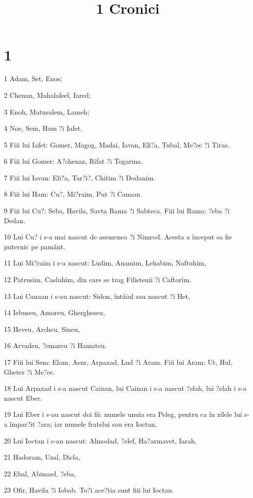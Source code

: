 

\title{1 Cronici}


\chapter{1}

\par 1 Adam, Set, Enos;
\par 2 Chenan, Mahalaleel, Iared;
\par 3 Enoh, Matusalem, Lameh;
\par 4 Noe, Sem, Ham ?i Iafet.
\par 5 Fiii lui Iafet: Gomer, Magog, Madai, Iavan, Eli?a, Tubal, Me?ec ?i Tiras.
\par 6 Fiii lui Gomer: A?chenaz, Rifat ?i Togarma.
\par 7 Fiii lui Iavan: Eli?a, Tar?i?, Chitim ?i Dodanim.
\par 8 Fiii lui Ham: Cu?, Mi?raim, Put ?i Canaan.
\par 9 Fiii lui Cu?: Seba, Havila, Savta Rama ?i Sabteca. Fiii lui Rama: ?eba ?i Dedan.
\par 10 Lui Cu? i s-a mai nascut de asemenea ?i Nimrod. Acesta a început sa fie puternic pe pamânt.
\par 11 Lui Mi?raim i s-a nascut: Ludim, Anamim, Lehabim, Naftuhim,
\par 12 Patrusim, Casluhim, din care se trag Filistenii ?i Caftorim.
\par 13 Lui Canaan i s-au nascut: Sidon, întâiul sau nascut ?i Het,
\par 14 Iebuseu, Amoreu, Ghergheseu,
\par 15 Heveu, Archeu, Sineu,
\par 16 Arvadeu, ?emareu ?i Hamateu.
\par 17 Fiii lui Sem: Elam, Asur, Arpaxad, Lud ?i Aram. Fiii lui Aram: Ut, Hul, Gheter ?i Me?ec.
\par 18 Lui Arpaxad i s-a nascut Cainan, lui Cainan i s-a nascut ?elah, lui ?elah i s-a nascut Eber.
\par 19 Lui Eber i s-au nascut doi fii: numele unuia era Peleg, pentru ca în zilele lui s-a împar?it ?ara; iar numele fratelui sau era Ioctan.
\par 20 Lui Ioctan i s-au nascut: Almodad, ?elef, Ha?armavet, Iarah,
\par 21 Hadoram, Uzal, Dicla,
\par 22 Ebal, Abimael, ?eba,
\par 23 Ofir, Havila ?i Iobab. To?i ace?tia sunt fiii lui Ioctan.

